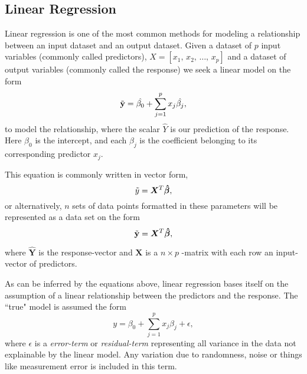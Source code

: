 \subsection{Linear Regression}


Linear regression is one of the most common methods for modeling a relationship between an input dataset and an output dataset.
Given a dataset of $p$ input variables (commonly called predictors), $X=[x_1, \, x_2, \, \ldots, \, x_p]$ and a dataset of output variables (commonly called the response) we seek a linear model on the form
\begin{equation}
\Tilde{\mathbf{y}}=\hat{\beta_0}+\sum_{j=1}^{p}x_j\hat{\beta_j},
\end{equation}
to model the relationship, where the scalar $\hat{Y}$ is our prediction of the response. 
Here $\beta_0$ is the intercept, and each $\beta_j$ is the coefficient belonging to its corresponding predictor $x_j$. 

This equation is commonly written in vector form, 
\begin{equation}
\Tilde{y}=\boldsymbol{X}^T\boldsymbol{\hat{\beta}},
\end{equation}
or alternatively, $n$ sets of data points formatted in these parameters will be represented as a data set on the form
\begin{equation}
\Tilde{\mathbf{y}}=\boldsymbol{X}^T\boldsymbol{\hat{\beta}},
\end{equation}

where $\boldsymbol{\hat{Y}}$ is the response-vector and $\boldsymbol{X}$ is a $n\times p$ -matrix with each row an input-vector of predictors. 


As can be inferred by the equations above, linear regression bases itself on the assumption of a linear relationship between the predictors and the response. 
The ``true" model is assumed the form 
\begin{equation}\label{OG_y}
y=\beta_0+\sum_{j=1}^{p}x_j\beta_j+\epsilon,
\end{equation}
where $\epsilon$ is a \textit{error-term} or \textit{residual-term} representing all variance in the data not explainable by the linear model. 
Any variation due to randomness, noise or things like measurement error is included in this term. 

